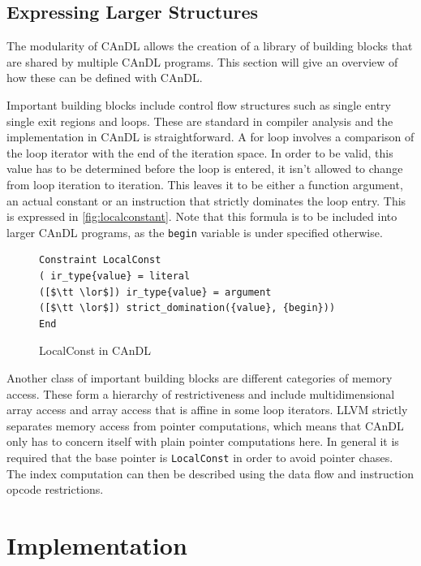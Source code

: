 \subsection{Expressing Larger Structures}

    The modularity of CAnDL allows the creation of a library of building blocks
    that are shared by multiple CAnDL programs.
    This section will give an overview of how these can be defined with CAnDL.

    Important building blocks include control flow structures such as single
    entry single exit regions and loops.
    These are standard in compiler analysis and the implementation in CAnDL is
    straightforward.
    A for loop involves a comparison of the loop iterator with the end of the
    iteration space.
    In order to be valid, this value has to be determined before the loop is
    entered, it isn't allowed to change from loop iteration to iteration.
    This leaves it to be either a function argument, an actual constant or an
    instruction that strictly dominates the loop entry.
    This is expressed in \autoref{fig:localconstant}.
    Note that this formula is to be included into larger CAnDL programs, as the
    \texttt{begin} variable is under specified otherwise.

\begin{figure}[ht]
\begin{lstlisting}[language=CAnDL]
Constraint LocalConst
( ir_type{value} = literal
([$\tt \lor$]) ir_type{value} = argument
([$\tt \lor$]) strict_domination({value}, {begin}))
End
\end{lstlisting}
\vspace{-0.3cm}
\caption{LocalConst in CAnDL}
\label{fig:localconstant}
\end{figure}

    Another class of important building blocks are different categories of
    memory access.
    These form a hierarchy of restrictiveness and include multidimensional array
    access and array access that is affine in some loop iterators.
    LLVM strictly separates memory access from pointer computations, which means
    that CAnDL only has to concern itself with plain pointer computations here.
    In general it is required that the base pointer is \texttt{LocalConst} in
    order to avoid pointer chases.
    The index computation can then be described using the data flow and
    instruction opcode restrictions.

\section{Implementation}

